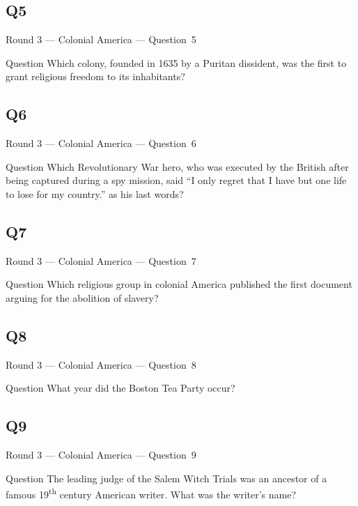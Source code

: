 \documentclass[11pt]{beamer}
\begin{document}
\subsection*{Q5}
\begin{frame}[t]{Round 3 --- Colonial America --- \mbox{Question 5}}
    \vspace{-0.5em}
    \begin{block}{Question}
        Which colony, founded in 1635 by a Puritan dissident, was the first to grant religious freedom to its inhabitants?
    \end{block}
\end{frame}
\subsection*{Q6}
\begin{frame}[t]{Round 3 --- Colonial America --- \mbox{Question 6}}
    \vspace{-0.5em}
    \begin{block}{Question}
        Which Revolutionary War hero, who was executed by the British after being captured during a spy mission, said ``I only regret that I have but one life to lose for my country.'' as his last words?
    \end{block}
\end{frame}
\subsection*{Q7}
\begin{frame}[t]{Round 3 --- Colonial America --- \mbox{Question 7}}
    \vspace{-0.5em}
    \begin{block}{Question}
        Which religious group in colonial America published the first document arguing for the abolition of slavery?
    \end{block}
\end{frame}
\subsection*{Q8}
\begin{frame}[t]{Round 3 --- Colonial America --- \mbox{Question 8}}
    \vspace{-0.5em}
    \begin{block}{Question}
        What year did the Boston Tea Party occur?
    \end{block}
\end{frame}
\subsection*{Q9}
\begin{frame}[t]{Round 3 --- Colonial America --- \mbox{Question 9}}
    \vspace{-0.5em}
    \begin{block}{Question}
        The leading judge of the Salem Witch Trials was an ancestor of a famous 19\textsuperscript{th} century American writer. What was the writer's name?
    \end{block}
\end{frame}
\end{document}
